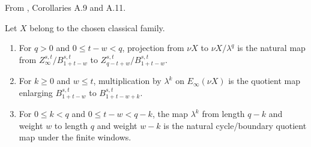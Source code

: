 \begin{theorem}
\label{frontier:Literature:b8fc8580677d}
From \cite{BHS}, Corollaries A.9 and A.11.\par

Let $X$ belong to the chosen classical family.
\begin{enumerate}
\item For $q>0$ and $0\le t-w<q$, projection from $\nu X$ to $\nu X/\lambda^q$ is the natural map from $Z_\infty^{s,t}/B_{1+t-w}^{s,t}$ to $Z_{q-t+w}^{s,t}/B_{1+t-w}^{s,t}$.
\item For $k\ge0$ and $w\le t$, multiplication by $\lambda^k$ on $E_\infty(\nu X)$ is the quotient map enlarging $B_{1+t-w}^{s,t}$ to $B_{1+t-w+k}^{s,t}$.
\item For $0\le k<q$ and $0\le t-w<q-k$, the map $\lambda^k$ from length $q-k$ and weight $w$ to length $q$ and weight $w-k$ is the natural cycle/boundary quotient map under the finite windows.
\end{enumerate}
\end{theorem}


